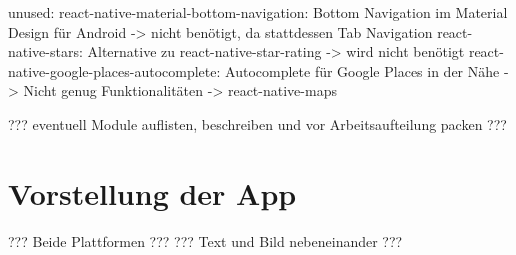unused:
react-native-material-bottom-navigation: Bottom Navigation im Material Design für Android -> nicht benötigt, da stattdessen Tab Navigation
react-native-stars: Alternative zu react-native-star-rating -> wird nicht benötigt
react-native-google-places-autocomplete: Autocomplete für Google Places in der Nähe -> Nicht genug Funktionalitäten -> react-native-maps

??? eventuell Module auflisten, beschreiben und vor Arbeitsaufteilung packen ???






\section{Vorstellung der App}
??? Beide Plattformen ???
??? Text und Bild nebeneinander ???

